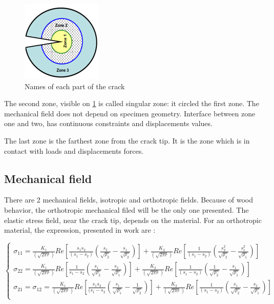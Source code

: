 \begin{figure}[th]
	\centering
	\includegraphics{Figures/Crack_zones}
	\decoRule
	\caption[Crack zones]{Names of each part of the crack}
	\label{fig:Fig4}
\end{figure}

The second zone, visible on \ref{fig:Fig4} is called singular zone: it circled the first zone. The mechanical field does not depend on specimen geometry. Interface between zone one and two, has continuous constraints and displacements values.

The last zone is the farthest zone from the crack tip. It is the zone which is in contact with loads and displacements forces.

\subsection{Mechanical field}

There are 2 mechanical fields, isotropic and orthotropic fields. Because of wood behavior, the orthotropic mechanical filed will be the only one presented. 
The elastic stress field, near the crack tip, depends on the material. For an orthotropic material, the expression, presented in \parencite{Reference10} work are :

\begin{equation}
	\left\{
	\begin{array}{rcr}
		\sigma_{11}=\frac{K_{1}}{(\sqrt{2 \pi r})}Re[\frac{s_{1}s_{2}}{(s_{1}-s_{2})}(\frac{s_{2}}{\sqrt{\rho_{2}}}-\frac{s_{1}}{\sqrt{\rho_{2}}})]+\frac{K_{2}}{(\sqrt{2 \pi r})}Re[\frac{1}{(s_{1}-s_{2})}(\frac{s_{2}^{2}}{\sqrt{\rho_{2}}}-\frac{s_{1}^{2}}{\sqrt{\rho_{1}}})]\\
		\sigma_{22}=\frac{K_{1}}{(\sqrt{2 \pi r})}Re[\frac{1}{s_{1}-s_{2}}(\frac{s_{1}}{\sqrt{\rho_{2}}}-\frac{s_{2}}{\sqrt{\rho_{1}}})]+\frac{K_{2}}{(\sqrt{2 \pi r})}Re[\frac{1}{(s_{1}-s_{2})}(\frac{1}{\sqrt{\rho_{2}}}-\frac{s_{1}}{\sqrt{\rho_{1}}})]\\
		\sigma_{21}=\sigma_{12}=\frac{K_{1}}{(\sqrt{2 \pi r})}Re[\frac{s_{1}s_{2}}{(s_{1}-s_{2}}(\frac{s_{1}}{\sqrt{\rho_{1}}}-\frac{1}{\sqrt{\rho_{2}}})]+\frac{K_{2}}{(\sqrt{ 2\pi r})}Re[\frac{1}{(s_{1}-s_{2})}(\frac{s_{1}}{\sqrt{\rho_{2}}}-\frac{s_{2}}{\sqrt{\rho_{1}}})] \\
	\end{array}
	\right.			
	\label{eq:stresses terms from Orthotropic field}
\end{equation} 

